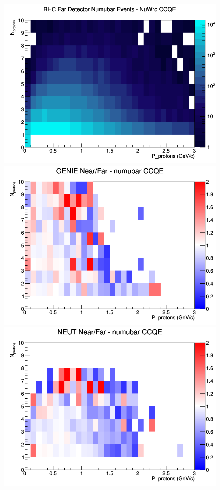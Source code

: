 \begin{figure}[h]
\endminipage
{}
\includegraphics[width=\linewidth]{N_P/nominal/protons/CCQE_RHC_FD_numubar_N_P_NuWro.png}
\endminipage
\newline
{}
\includegraphics[width=\linewidth]{N_P/nominal/protons/ratios/CCQE_GENIE_numubar_NF_N_P.png}
\endminipage
{}
\includegraphics[width=\linewidth]{N_P/nominal/protons/ratios/CCQE_NEUT_numubar_NF_N_P.png}

\end{figure}
